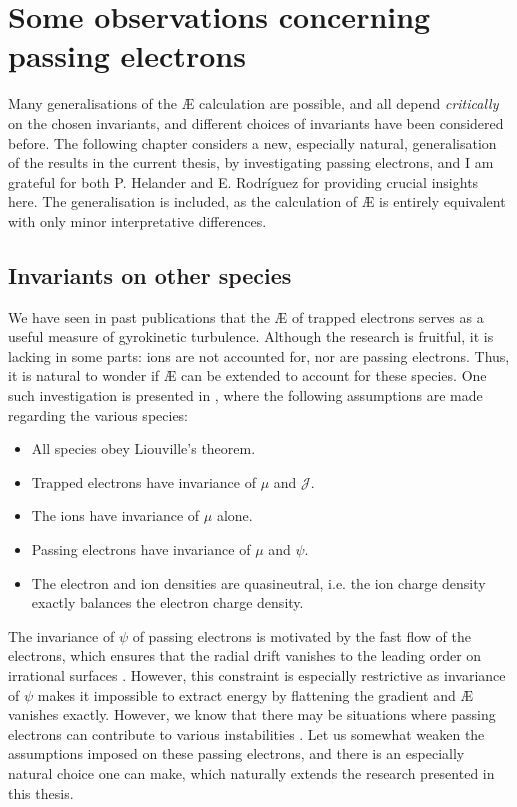 \chapter{Some observations concerning passing electrons}
\vspace*{3mm}
Many generalisations of the \AE{} calculation are possible, and all depend {\it critically} on the chosen invariants, and different choices of invariants have been considered before. The following chapter considers a new, especially natural, generalisation of the results in the current thesis, by investigating passing electrons, and I am grateful for both P. Helander and E. Rodr\'iguez for providing crucial insights here. The generalisation is included, as the calculation of \AE{} is entirely equivalent with only minor interpretative differences.

\section{Invariants on other species}
We have seen in past publications that the \AE{} of trapped electrons serves as a useful measure of gyrokinetic turbulence. Although the research is fruitful, it is lacking in some parts: ions are not accounted for, nor are passing electrons. Thus, it is natural to wonder if \AE{} can be extended to account for these species. One such investigation is presented in \citet{helander2020available}, where the following assumptions are made regarding the various species:
\begin{itemize}
    \item All species obey Liouville's theorem.
    \item Trapped electrons have invariance of $\mu$ and $\mathcal{J}$.
    \item The ions have invariance of $\mu$ alone.
    \item Passing electrons have invariance of $\mu$ and $\psi$.
    \item The electron and ion densities are quasineutral, i.e. the ion charge density exactly balances the electron charge density.
\end{itemize}
The invariance of $\psi$ of passing electrons is motivated by the fast flow of the electrons, which ensures that the radial drift vanishes to the leading order on irrational surfaces \cite{helander2014theory}. However, this constraint is especially restrictive as invariance of $\psi$ makes it impossible to extract energy by flattening the gradient and \AE{} vanishes exactly. However, we know that there may be situations where passing electrons can contribute to various instabilities \cite{jenko2000electron,landreman2015universal,helander2015universal,hardman2022extended,costello2022universal}. Let us somewhat weaken the assumptions imposed on these passing electrons, and there is an especially natural choice one can make, which naturally extends the research presented in this thesis. 

